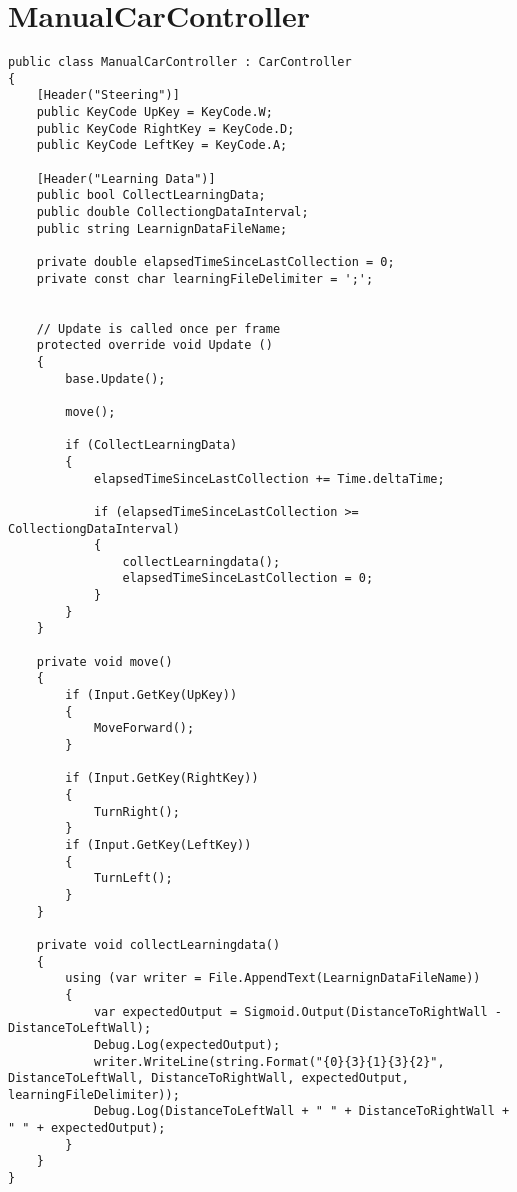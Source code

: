 \documentclass[12pt,a4paper]{article}
\begin{document}
	\section*{ManualCarController}
	\begin{lstlisting}
public class ManualCarController : CarController
{
    [Header("Steering")]
    public KeyCode UpKey = KeyCode.W;
    public KeyCode RightKey = KeyCode.D;
    public KeyCode LeftKey = KeyCode.A;

    [Header("Learning Data")]
    public bool CollectLearningData;
    public double CollectiongDataInterval;
    public string LearnignDataFileName;

    private double elapsedTimeSinceLastCollection = 0;
    private const char learningFileDelimiter = ';';


    // Update is called once per frame
    protected override void Update ()
    {
        base.Update();

        move();

        if (CollectLearningData)
        {
            elapsedTimeSinceLastCollection += Time.deltaTime;

            if (elapsedTimeSinceLastCollection >= CollectiongDataInterval)
            {
                collectLearningdata();
                elapsedTimeSinceLastCollection = 0;
            }
        }
    }

    private void move()
    {
        if (Input.GetKey(UpKey))
        {
            MoveForward();
        }

        if (Input.GetKey(RightKey))
        {
            TurnRight();
        }
        if (Input.GetKey(LeftKey))
        {
            TurnLeft();
        }
    }

    private void collectLearningdata()
    {
        using (var writer = File.AppendText(LearnignDataFileName))
        {
            var expectedOutput = Sigmoid.Output(DistanceToRightWall - DistanceToLeftWall);
            Debug.Log(expectedOutput);
            writer.WriteLine(string.Format("{0}{3}{1}{3}{2}", DistanceToLeftWall, DistanceToRightWall, expectedOutput, learningFileDelimiter));
            Debug.Log(DistanceToLeftWall + " " + DistanceToRightWall + " " + expectedOutput);
        }
    }
}
	\end{lstlisting}
	
\end{document}
